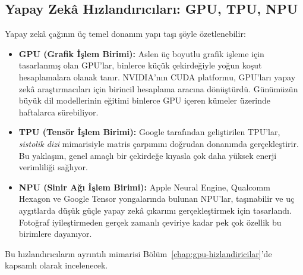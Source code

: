 \subsection{Yapay Zekâ Hızlandırıcıları: GPU, TPU, NPU}
\label{sec:yz-hizlandiricilar-giris}

Yapay zekâ çağının üç temel donanım yapı taşı şöyle özetlenebilir:

\begin{itemize}
    \item \textbf{GPU (Grafik İşlem Birimi):} Aslen üç boyutlu grafik işleme için tasarlanmış olan GPU'lar, binlerce küçük çekirdeğiyle yoğun koşut hesaplamalara olanak tanır. NVIDIA'nın CUDA platformu, GPU'ları yapay zekâ araştırmacıları için birincil hesaplama aracına dönüştürdü. Günümüzün büyük dil modellerinin eğitimi binlerce GPU içeren kümeler üzerinde haftalarca sürebiliyor.

    \item \textbf{TPU (Tensör İşlem Birimi):} Google tarafından geliştirilen TPU'lar, \emph{sistolik dizi} mimarisiyle matris çarpımını doğrudan donanımda gerçekleştirir. Bu yaklaşım, genel amaçlı bir çekirdeğe kıyasla çok daha yüksek enerji verimliliği sağlıyor.

    \item \textbf{NPU (Sinir Ağı İşlem Birimi):} Apple Neural Engine, Qualcomm Hexagon ve Google Tensor yongalarında bulunan NPU'lar, taşınabilir ve uç aygıtlarda düşük güçle yapay zekâ çıkarımı gerçekleştirmek için tasarlandı. Fotoğraf iyileştirmeden gerçek zamanlı çeviriye kadar pek çok özellik bu birimlere dayanıyor.
\end{itemize}
Bu hızlandırıcıların ayrıntılı mimarisi Bölüm~\ref{chap:gpu-hizlandiricilar}'de kapsamlı olarak incelenecek.

